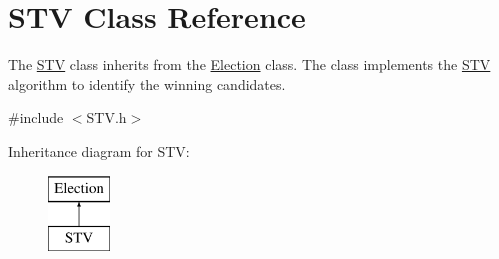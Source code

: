 \hypertarget{class_s_t_v}{}\section{S\+TV Class Reference}
\label{class_s_t_v}


The \mbox{\hyperlink{class_s_t_v}{S\+TV}} class inherits from the \mbox{\hyperlink{class_election}{Election}} class. The class implements the \mbox{\hyperlink{class_s_t_v}{S\+TV}} algorithm to identify the winning candidates.  




{\ttfamily \#include $<$S\+T\+V.\+h$>$}

Inheritance diagram for S\+TV\+:\begin{figure}[H]
\begin{center}
\leavevmode
\includegraphics[height=2.000000cm]{class_s_t_v}
\end{center}
\end{figure}

